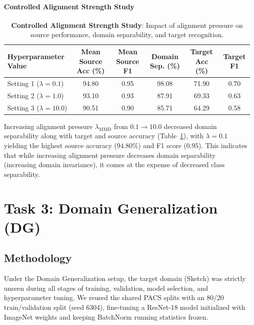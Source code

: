 \documentclass{article}
\begin{document}
\paragraph{Controlled Alignment Strength Study}
\begin{table}[H]
    \centering
    \caption{\textbf{Controlled Alignment Strength Study}: Impact of alignment pressure on source performance, domain separability, and target recognition.}
    \label{tab:task2_design_study}
    \begin{tabular}{lccccc}
        \toprule
        \textbf{Hyperparameter Value} & \textbf{Mean Source Acc (\%)} & \textbf{Mean Source F1} & \textbf{Domain Sep. (\%)} & \textbf{Target Acc (\%)} & \textbf{Target F1} \\
        \midrule
        Setting 1 ($\lambda=0.1$) & 94.80 & 0.95 & 98.08 & 71.90 & 0.70 \\
        Setting 2 ($\lambda=1.0$) & 93.10 & 0.93 & 87.91 & 69.33 & 0.63 \\
        Setting 3 ($\lambda=10.0$) & 90.51 & 0.90 & 85.71 & 64.29 & 0.58 \\
        \bottomrule
    \end{tabular}
\end{table}
Increasing alignment pressure $\lambda_{\text{MMD}}$ from $0.1 \rightarrow 10.0$ decreased domain separability along with target and source accuracy (Table~\ref{tab:task2_design_study}), with $\lambda=0.1$ yielding the highest source accuracy ($94.80\%$) and F1 score ($0.95$). This indicates that while increasing alignment pressure decreases domain separability (increasing domain invariance), it comes at the expense of decreased class separability.


\newpage
\section{Task 3: Domain Generalization (DG)}
\label{sec:task3}

\subsection{Methodology}
Under the Domain Generalization setup, the target domain (Sketch) was strictly unseen during all stages of training, validation, model selection, and hyperparameter tuning. We reused the shared PACS splits with an 80/20 train/validation split (seed 6304), fine-tuning a ResNet-18 model initialized with ImageNet weights and keeping BatchNorm running statistics frozen.
\end{document}
